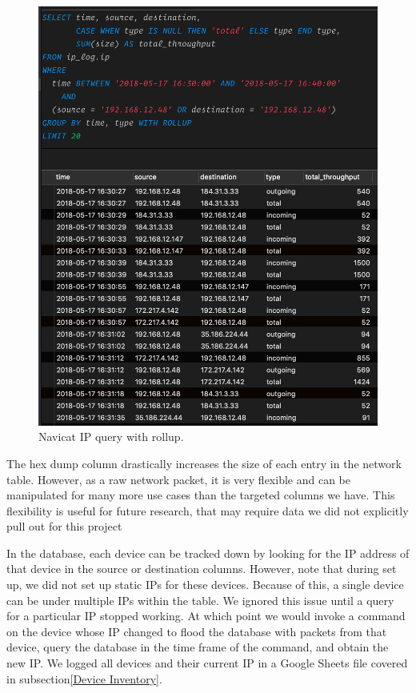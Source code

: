 \begin{figure}[H]
    \centering
    \includegraphics[width=1\textwidth]{figures/navicatRollup.png}
    \caption{Navicat IP query with rollup.}
    \label{fig:navicatRollup}
\end{figure}

The hex dump column drastically increases the size of each entry in the network table. However, as a raw network packet, it is very flexible and can be manipulated for many more use cases than the targeted columns we have. This flexibility is useful for future research, that may require data we did not explicitly pull out for this project

In the database, each device can be tracked down by looking for the IP address of that device in the source or destination columns. However, note that during set up, we did not set up static IPs for these devices. Because of this, a single device can be under multiple IPs within the table. We ignored this issue until a query for a particular IP stopped working. At which point we would invoke a command on the device whose IP changed to flood the database with packets from that device, query the database in the time frame of the command, and obtain the new IP. We logged all devices and their current IP in a Google Sheets \cite{googleSheets} file covered in subsection\ref{Device Inventory}.

